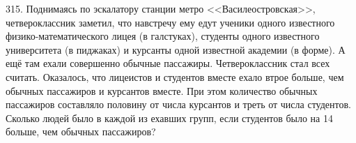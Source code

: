 315. Поднимаясь по эскалатору станции метро <<Василеостровская>>, четвероклассник заметил, что навстречу ему едут ученики одного известного физико-математического лицея (в галстуках), студенты одного известного университета (в пиджаках) и курсанты одной известной академии (в форме). А ещё там ехали совершенно обычные пассажиры. Четвероклассник стал всех считать. Оказалось, что лицеистов и студентов вместе ехало втрое больше, чем обычных пассажиров и курсантов вместе. При этом количество обычных пассажиров составляло половину от числа курсантов и треть от числа студентов. Сколько людей было в каждой из ехавших групп, если студентов было на 14 больше, чем обычных пассажиров?\\
